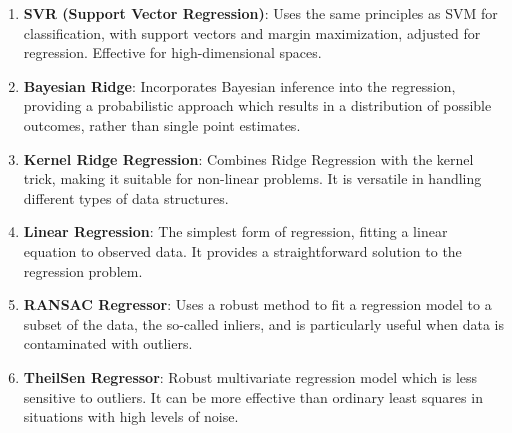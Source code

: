 \begin{enumerate}
    \item \textbf{SVR (Support Vector Regression)}: Uses the same principles as SVM for classification, with support vectors and margin maximization, adjusted for regression. Effective for high-dimensional spaces.

    \item \textbf{Bayesian Ridge}: Incorporates Bayesian inference into the regression, providing a probabilistic approach which results in a distribution of possible outcomes, rather than single point estimates.

    \item \textbf{Kernel Ridge Regression}: Combines Ridge Regression with the kernel trick, making it suitable for non-linear problems. It is versatile in handling different types of data structures.

    \item \textbf{Linear Regression}: The simplest form of regression, fitting a linear equation to observed data. It provides a straightforward solution to the regression problem.

    \item \textbf{RANSAC Regressor}: Uses a robust method to fit a regression model to a subset of the data, the so-called inliers, and is particularly useful when data is contaminated with outliers.

    \item \textbf{TheilSen Regressor}: Robust multivariate regression model which is less sensitive to outliers. It can be more effective than ordinary least squares in situations with high levels of noise.
\end{enumerate}
